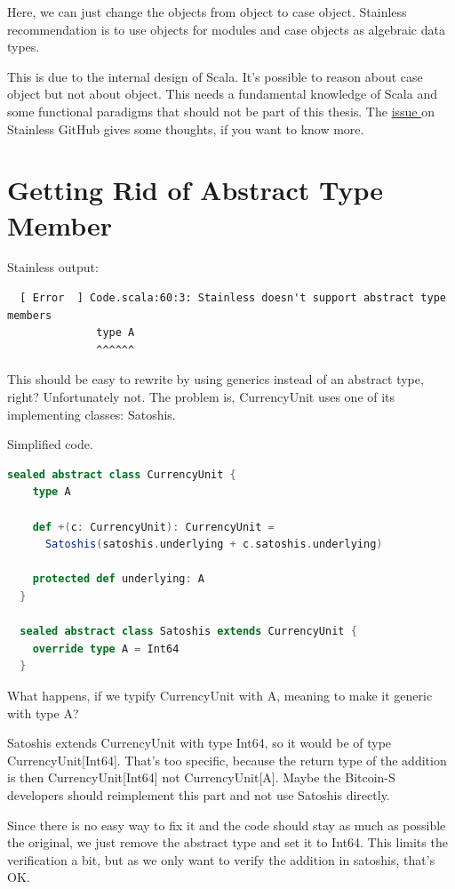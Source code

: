 Here, we can just change the objects from object to case object.
Stainless recommendation is to use objects for modules and case objects as algebraic data types.

This is due to the internal design of Scala.
It's possible to reason about case object but not about object.
This needs a fundamental knowledge of Scala and some functional paradigms that should not be part of this thesis.
The \href{https://github.com/epfl-lara/stainless/issues/520}{issue } on Stainless GitHub gives some thoughts, if you want to know more.


\section{Getting Rid of Abstract Type Member}

Stainless output:
{\footnotesize\begin{verbatim}
  [ Error  ] Code.scala:60:3: Stainless doesn't support abstract type members
              type A
              ^^^^^^
\end{verbatim}}

This should be easy to rewrite by using generics instead of an abstract type, right?
Unfortunately not.
The problem is, CurrencyUnit uses one of its implementing classes: Satoshis.

Simplified code.
\begin{lstlisting}[language=scala]
  sealed abstract class CurrencyUnit {
    type A

    def +(c: CurrencyUnit): CurrencyUnit =
      Satoshis(satoshis.underlying + c.satoshis.underlying)

    protected def underlying: A
  }

  sealed abstract class Satoshis extends CurrencyUnit {
    override type A = Int64
  }
\end{lstlisting}

What happens, if we typify CurrencyUnit with A, meaning to make it generic with type A?

Satoshis extends CurrencyUnit with type Int64, so it would be of type CurrencyUnit[Int64].
That's too specific, because the return type of the addition is then CurrencyUnit[Int64] not CurrencyUnit[A].
Maybe the Bitcoin-S developers should reimplement this part and not use Satoshis directly.

Since there is no easy way to fix it and the code should stay as much as possible the original, we just remove the abstract type and set it to Int64.
This limits the verification a bit, but as we only want to verify the addition in satoshis, that's OK.


